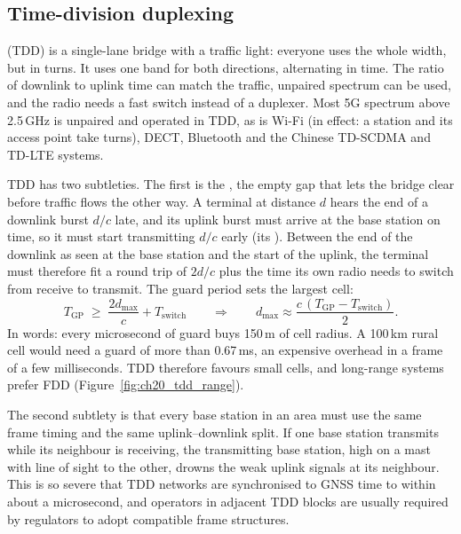 \subsection{Time-division duplexing}

 (TDD) is a single-lane bridge with a traffic light: everyone uses the
whole width, but in turns. It uses one band for both directions, alternating in time. The ratio of
downlink to uplink time can match the traffic, unpaired spectrum can be used, and the radio needs a
fast switch instead of a duplexer. Most 5G spectrum above 2.5\,GHz is unpaired and operated in TDD,
as is Wi-Fi (in effect: a station and its access point take turns), DECT, Bluetooth and the Chinese
TD-SCDMA and TD-LTE systems.

TDD has two subtleties. The first is the , the empty gap that lets the bridge
clear before traffic flows the other way. A terminal at distance $d$ hears the end of a downlink burst
$d/c$ late, and its uplink burst must arrive at the base station on time, so it must start
transmitting $d/c$ early (its ). Between the end of the downlink as seen at the
base station and the start of the uplink, the terminal must therefore fit a round trip of $2d/c$ plus
the time its own radio needs to switch from receive to transmit. The guard period sets the largest cell:
\begin{equation}
T_{\mathrm{GP}}\;\ge\;\frac{2d_{\max}}{c}+T_{\mathrm{switch}}
\qquad\Longrightarrow\qquad
d_{\max}\approx\frac{c\,(T_{\mathrm{GP}}-T_{\mathrm{switch}})}{2}.
\label{eq:ch20:gp}
\end{equation}
In words: every microsecond of guard buys 150\,m of cell radius. A 100\,km rural cell would need a
guard of more than 0.67\,ms, an expensive overhead in a frame of a few milliseconds. TDD therefore
favours small cells, and long-range systems prefer FDD (Figure~\ref{fig:ch20_tdd_range}).

The second subtlety is that every base station in an area must use the same frame timing and
the same uplink--downlink split. If one base station transmits while its neighbour is
receiving, the transmitting base station, high on a mast with line of sight to the other, drowns
the weak uplink signals at its neighbour. This  is so severe that
TDD networks are synchronised to GNSS time to within about a microsecond, and operators in
adjacent TDD blocks are usually required by regulators to adopt compatible frame structures.

